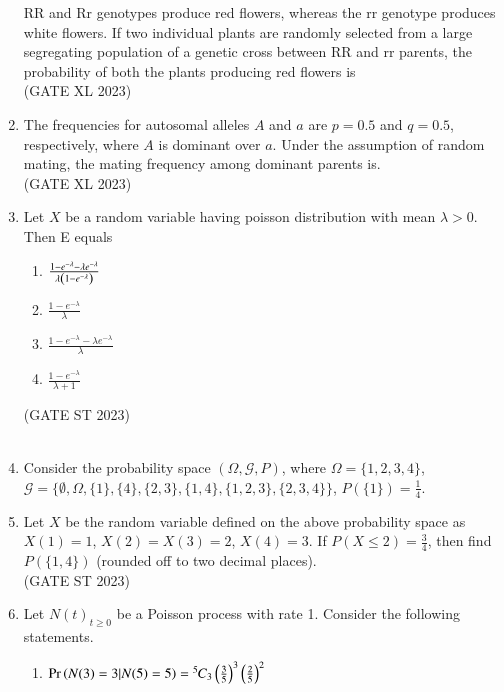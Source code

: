 \begin{enumerate}[label=\thechapter.\arabic*,ref=\thechapter.\theenumi]
RR and Rr genotypes produce red flowers, whereas the rr genotype produces
white flowers. If two individual plants are randomly selected from a large
segregating population of a genetic cross between RR and rr parents, the
probability of both the plants producing red flowers is\\
\hfill(GATE XL 2023)\\

\item The frequencies for autosomal alleles $A$ and $a$ are $p = 0.5$ and $q = 0.5$,
respectively, where $A$ is dominant over $a$. Under the assumption of random
mating, the mating frequency among dominant parents is.\\
\hfill(GATE XL 2023)\\

\item Let $X$ be a random variable having poisson distribution with mean $\lambda>0$. Then E equals
\begin{enumerate}
	\item $\frac{1-e^{-\lambda}-\lambda e^{-\lambda}}{\lambda\left(1-e^{-\lambda}\right)}$
	\item $\frac{1-e^{-\lambda}}{\lambda}$
	\item $\frac{1-e^{-\lambda}-\lambda e^{-\lambda}}{\lambda}$
	\item $\frac{1-e^{-\lambda}}{\lambda +1}$
\end{enumerate}
\hfill(GATE ST 2023)\\
\solution\\

\item Consider the probability space $(\Omega, \mathcal{G}, P)$, where 
   $ \Omega = \{1, 2, 3, 4\}$, 
    $\mathcal{G} = \{\emptyset, \Omega, \{1\}, \{4\}, \{2, 3\}, \{1, 4\}, \{1, 2, 3\}, \{2, 3, 4\}\}$, 
    $P(\{1\}) = \frac{1}{4}$.
\item Let $X$ be the random variable defined on the above probability space as
   $ X(1) = 1$, 
    $X(2) = X(3) = 2$, 
    $X(4) = 3$.
If $P(X \leq 2) = \frac{3}{4}$, then find $P(\{1, 4\})$ (rounded off to two decimal places).\\\hfill (GATE ST 2023)\\

\item Let ${N(t)}_{t\ge 0}$ be a Poisson process with rate 1. Consider the following statements. 
\begin{enumerate}[label=(\alph*)]
\item $\Pr\left(N(3)=3|N(5)=5\right)={{}^{5}\mkern-1muC_{3}}\left(\frac{3}{5}\right)^3 \left(\frac{2}{5}\right)^2$

\end{enumerate}
\end{enumerate}
